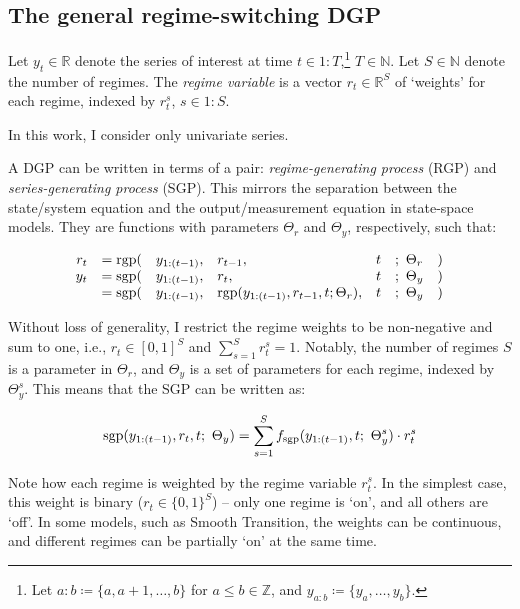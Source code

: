 \documentclass[
  letterpaper,
  DIV=11,
  numbers=noendperiod]{scrartcl}
\numberwithin{equation}{section}
\numberwithin{table}{section}
\numberwithin{figure}{section}
\begin{document}
\subsection{The general regime-switching DGP}\label{sec-theory-dgp}

Let \(y_t \in \mathbb{R}\) denote the series of interest at time
\(t \in 1:T\),\footnote{Let \(a:b \coloneqq \{a, a+1, \dots, b\}\) for
  \(a \leq b \in \mathbb{Z}\), and
  \(y_{a:b} \coloneqq \{y_a, \dots, y_b\}\).} \(T \in \mathbb{N}\). Let
\(S \in \mathbb{N}\) denote the number of regimes. The \emph{regime
variable} is a vector \(r_t \in \mathbb{R}^S\) of `weights' for each
regime, indexed by \(r^s_t\), \(s \in 1:S\).

In this work, I consider only univariate series.

A DGP can be written in terms of a pair: \emph{regime-generating
process} (RGP) and \emph{series-generating process} (SGP). This mirrors
the separation between the state/system equation and the
output/measurement equation in state-space models. They are functions
with parameters \(\Theta_r\) and \(\Theta_y\), respectively, such that:

\begin{equation}
\begin{array}{rrlllll}
    r_t &= \text{rgp}(&y_{1:(t-1)}, &r_{t-1}, &t &;~ \Theta_r &)\\
    y_t &= \text{sgp}(&y_{1:(t-1)}, &r_t,     &t &;~ \Theta_y &)\\
        &= \text{sgp}(&y_{1:(t-1)}, &\text{rgp}(y_{1:(t-1)}, r_{t-1}, t; \Theta_r), &t &;~ \Theta_y &)
\end{array}
\end{equation}

Without loss of generality, I restrict the regime weights to be
non-negative and sum to one, i.e., \(r_t \in [0, 1]^S\) and
\(\sum_{s = 1}^S r^s_t = 1\). Notably, the number of regimes \(S\) is a
parameter in \(\Theta_r\), and \(\Theta_y\) is a set of parameters for
each regime, indexed by \(\Theta^s_y\). This means that the SGP can be
written as:

\begin{equation}
    \text{sgp}(y_{1:(t-1)}, r_t, t;~ \Theta_y) = \sum_{s = 1}^S f_{\text{sgp}}(y_{1:(t-1)}, t;~ \Theta^s_y) \cdot r^s_t
\end{equation}

Note how each regime is weighted by the regime variable \(r^s_t\). In
the simplest case, this weight is binary (\(r_t \in \{0, 1\}^S\)) --
only one regime is `on', and all others are `off'. In some models, such
as Smooth Transition, the weights can be continuous, and different
regimes can be partially `on' at the same time.
\end{document}
